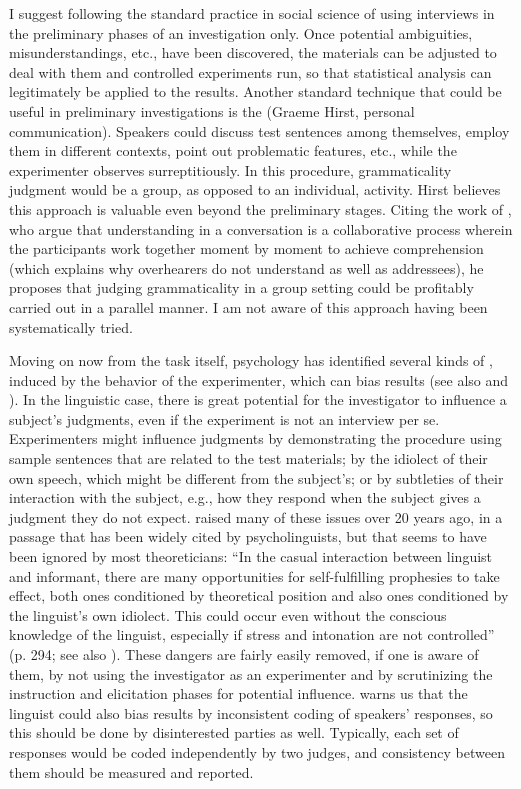  \noindent
 I suggest following the standard practice in social science of using interviews in the preliminary phases of an investigation only. Once potential ambiguities, misunderstandings, etc., have been discovered, the materials can be adjusted to deal with them and controlled experiments run, so that statistical analysis can legitimately be applied to the results. Another standard technique that could be useful in preliminary investigations is the  (Graeme Hirst, personal communication). Speakers could discuss test sentences among themselves, employ them in different contexts, point out problematic features, etc., while the experimenter observes surreptitiously. In this procedure, grammaticality judgment would be a group, as opposed to an individual, activity. Hirst believes this approach is valuable even beyond the preliminary stages. Citing the work of \citet{SchoberEtAl1989}, who argue that understanding in a conversation is a collaborative process wherein the participants work together moment by moment to achieve comprehension (which explains why overhearers do not understand as well as addressees), he proposes that judging grammaticality in a group setting could be profitably carried out in a parallel manner. I am not aware of this approach having been systematically tried.

 Moving on now from the task itself, psychology has identified several kinds of , induced by the behavior of the experimenter, which can bias results (see also \citet{Labov1975} and \citet{Greenbaum1988}). In the linguistic case, there is great potential for the investigator to influence a subject's judgments, even if the experiment is not an interview per se. Experimenters might influence judgments by demonstrating the procedure using sample sentences that are related to the test materials; by the idiolect of their own speech, which might be different from the subject's; or by subtleties of their interaction with the subject, e.g., how they respond when the subject gives a judgment they do not expect. \citet{Heringer1970} raised many of these issues over 20 years ago, in a passage that has been
 widely cited by psycholinguists, but that seems to have been ignored by most theoreticians: ``In the casual interaction between linguist and informant, there are many opportunities for self-fulfilling prophesies to take effect, both ones conditioned by theoretical position and also ones conditioned by the linguist's own idiolect. This could occur even without the conscious knowledge of the linguist, especially if stress and intonation are not controlled'' (p. 294; see also \citealt{BradacEtAl1980}). These dangers are fairly easily removed, if one is aware of them, by not using the investigator as an experimenter and by scrutinizing the instruction and elicitation phases for potential influence. \citet{Carden1970a} warns us that the linguist could also bias results by inconsistent coding of speakers' responses, so this should be done by disinterested parties as well. Typically, each set of responses would be coded independently by two judges, and consistency between them should be measured and reported.

